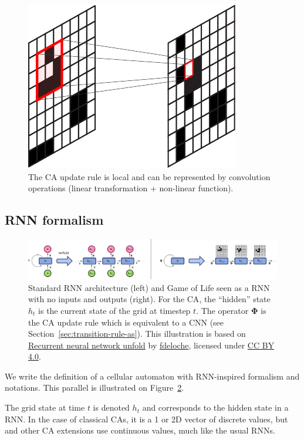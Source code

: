 \begin{figure}[htbp]
  \centering
  \includegraphics[width=.3\linewidth]{figures/ca_cnn}
  \caption{\label{fig:ca_cnn}The CA update rule is local and can be represented
    by convolution operations (linear transformation + non-linear function).}
\end{figure}

\subsection{RNN formalism}

\begin{figure}[!ht]
  \centering
  \includegraphics[width=\linewidth]{figures/rnn_and_gol.pdf}
  \caption{\label{fig:standard_rnn} Standard RNN architecture (left) and Game of
    Life seen as a RNN with no inputs and outputs (right). For the \ac{CA}, the
    ``hidden'' state $h_t$ is the current state of the grid at timestep $t$. The
    operator $\boldsymbol{\Phi}$ is the \ac{CA} update rule which is
    equivalent to a \ac{CNN} (see Section~\ref{sec:transition-rule-as}). This
    illustration is based on
    \href{https://commons.wikimedia.org/wiki/File:Recurrent_neural_network_unfold.svg}{Recurrent
      neural network unfold} by
    \href{https://commons.wikimedia.org/wiki/User:Ixnay}{fdeloche}, licensed
    under \href{https://creativecommons.org/licenses/by-sa/4.0/}{CC BY 4.0}.}
\end{figure}


We write the definition of a cellular automaton with RNN-inspired formalism and
notations. This parallel is illustrated on Figure~\ref{fig:standard_rnn}.

The grid state at time $t$ is denoted $h_t$ and corresponds to the hidden state
in a RNN\@. In the case of classical CAs, it is a 1 or 2D vector of discrete
values, but~\parencite{mordvintsevGrowingNeuralCellular2020} and other CA extensions
use continuous values, much like the usual RNNs.

